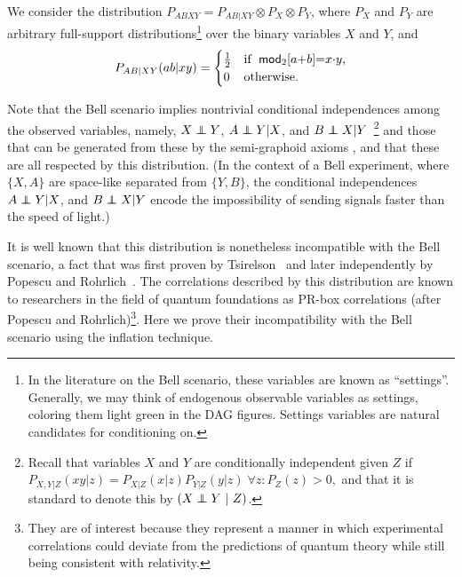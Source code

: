 We consider the distribution ${P_{A B X Y} = P_{A B | X Y} \otimes P_{X} \otimes P_{Y}}$, where $P_{X}$ and $P_{Y}$ are arbitrary full-support distributions\footnote{In the literature on the Bell scenario, these variables are known as ``settings''. Generally, we may think of endogenous observable variables as settings, coloring them light green in the DAG figures. Settings variables are natural candidates for conditioning on.} over the binary variables $X$ and $Y$, and
\begin{align}\begin{split}\label{eq:PRbox}
P_{A B | X Y}\parens{a b |x y}=\begin{cases}\tfrac{1}{2}&\text{if }\; \SmallNamedFunction[2]{mod}{a\cramp{+}b}\eql x\cramp{\cdot} y, \\ 0&\text{otherwise}.\end{cases}
\end{split}\end{align}


Note that the Bell scenario implies nontrivial conditional independences among the observed variables, namely, $X \indep Y$, $A \indep Y| X$, and $B \indep X|Y$~\footnote{Recall that variables $X$ and $Y$ are conditionally independent given $Z$ if $P_{X,Y|Z}(xy|z) =P_{X|Z}(x|z) P_{Y|Z}(y|z) \;\forall z: P_{Z}(z)>0,$  and that it is standard to denote this by  $(X\indep Y\text{ }|\text{ }Z)$.} 
 and those that can be generated from these by the semi-graphoid axioms \cite{WoodSpekkens}, and that these are all respected by this distribution.
(In the context of a Bell experiment, where $\{X,A\}$ are space-like separated from $\{Y,B\}$, the conditional independences $A \indep Y| X$, and $B \indep X|Y$ encode the impossibility of sending signals faster than the speed of light.)   

It is well known that this distribution is nonetheless incompatible with the Bell scenario, a fact that was first proven by Tsirelson~\cite{Tsirelson1980} and later independently by Popescu and Rohrlich~\cite{PROriginal,PRUnit}.
The correlations described by this distribution are known to researchers in the field of quantum foundations as PR-box correlations (after Popescu and Rohrlich)\footnote{They are of interest because they represent a manner in which experimental correlations could deviate from the predictions of quantum theory while still being consistent with relativity.}.  
Here we prove their incompatibility with the Bell scenario using the inflation technique. 

